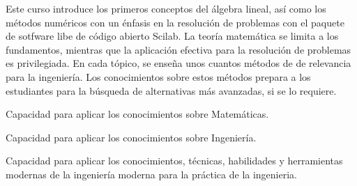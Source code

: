 \begin{syllabus}


\begin{justification}
Este curso introduce los primeros conceptos del álgebra lineal, así como los métodos numéricos con un énfasis en la resolución de problemas
con el paquete de sotfware libe de código abierto Scilab.
La teoría matemática se limita a los fundamentos, mientras que la aplicación efectiva para la resolución de problemas es privilegiada. 
En cada tópico, se enseña unos cuantos métodos de de relevancia para la ingeniería. 
Los conocimientos sobre estos métodos prepara a los estudiantes para la búsqueda de alternativas más avanzadas, si se lo requiere.


\end{justification}

\begin{goals}
\item Capacidad para aplicar los conocimientos sobre Matemáticas.
\item Capacidad para aplicar los conocimientos sobre Ingeniería.
\item Capacidad para aplicar los conocimientos, técnicas, habilidades y herramientas modernas de la ingeniería moderna para la práctica de la ingenieria.
 

\end{goals}

\begin{outcomes}
    \item {}
    \item {}
\end{outcomes}


\end{syllabus}
